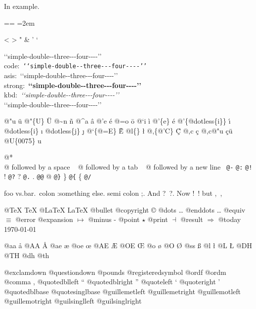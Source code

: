 \documentclass{book}
\makeatletter
\newenvironment{GNUTexinfopreformatted}{%
  \par\obeylines\obeyspaces\frenchspacing
  \parskip=\z@\parindent=\z@}{}
\makeatother
\begin{document}
In example.
\begin{GNUTexinfopreformatted}
\leftskip=2em\relax\ttfamily%

<
>
"
\&
'
`

{`}{`}simple-double{-}{-}three{-}{-}{-}four{-}{-}{-}-{'}{'}\leavevmode{}\\
code:\ \texttt{{`}{`}simple-double{-}{-}three{-}{-}{-}four{-}{-}{-}-{'}{'}} \leavevmode{}\\
asis:\ {`}{`}simple-double{-}{-}three{-}{-}{-}four{-}{-}{-}-{'}{'} \leavevmode{}\\
strong:\ \textbf{{`}{`}simple-double{-}{-}three{-}{-}{-}four{-}{-}{-}-{'}{'}} \leavevmode{}\\
kbd:\ {\ttfamily\textsl{{`}{`}simple-double{-}{-}three{-}{-}{-}four{-}{-}{-}-{'}{'}}} \leavevmode{}\\

`\hbox{}`simple-double-\hbox{}-three{-}{-}{-}four{-}{-}{-}-'\hbox{}'\leavevmode{}\\

%
%
%
%

@"u \"{u} 
@"\{U\} \"{U} 
@\~{}n \~{n}
@\^{}a \^{a}
@'e \'{e}
@=o \={o}
@`i \`{i}
@'\{e\} \'{e}
@'\{@dotless\{i\}\} \'{\i{}} 
@dotless\{i\} \i{}
@dotless\{j\} \j{}
@`\{@=E\} \`{\={E}} 
@l\{\} \l{}
@,\{@'C\} \c{\'{C}}
@,c \c{c}
@,c@"u \c{c}\"{u} \leavevmode{}\\

@U\{0075\} u

@* \leavevmode{}\\
@ followed by a space
\ {}
@ followed by a tab
\ {}
@ followed by a new line
\ {}\texttt{@-} \-{}
\texttt{@:} \@
\texttt{@!} \@!
\texttt{@?} \@?
\texttt{@.} \@.
\texttt{@@} @
\texttt{@\}} \}
\texttt{@\{} \{
\texttt{@/} 

foo vs.\@ bar.\ 
colon :\@And something else.
semi colon ;\@.
And ?\ ?\@.
Now !\ !\@@
but ,\ ,\@

@TeX \TeX{}
@LaTeX \LaTeX{}
@bullet \textbullet{}
@copyright \copyright{}
@dots \dots{}\@
@enddots \dots{}
@equiv $\equiv{}$
@error 
@expansion $\mapsto{}$
@minus -
@point $\star{}$
@print $\dashv{}$
@result $\Rightarrow{}$
@today \today{}

@aa \aa{}
@AA \AA{}
@ae \ae{}
@oe \oe{}
@AE \AE{}
@OE \OE{}
@o \o{}
@O \O{}
@ss \ss{}
@l \l{}
@L \L{}
@DH \DH{}
@TH \TH{}
@dh \dh{}
@th \th{}

@exclamdown \textexclamdown{}
@questiondown \textquestiondown{}
@pounds \textsterling{}
@registeredsymbol \circledR{}
@ordf \textordfeminine{}
@ordm \textordmasculine{}
@comma ,
@quotedblleft \textquotedblleft{}
@quotedblright \textquotedblright{}
@quoteleft \textquoteleft{}
@quoteright \textquoteright{}
@quotedblbase \quotedblbase{}
@quotesinglbase \quotesinglbase{}
@guillemetleft \guillemotleft{}
@guillemetright \guillemotright{}
@guillemotleft \guillemotleft{}
@guillemotright \guillemotright{}
@guilsinglleft \guilsinglleft{}
@guilsinglright \guilsinglright{}


\end{GNUTexinfopreformatted}
\end{document}
